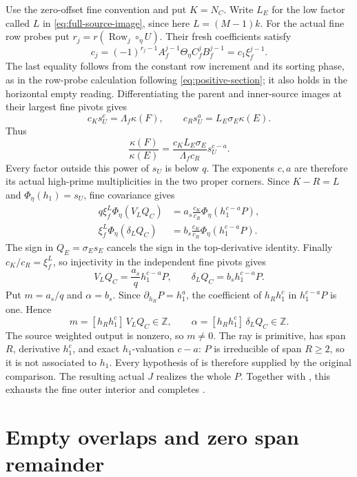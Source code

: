 \documentclass[11pt,a4paper]{amsart}
\numberwithin{equation}{section}
\theoremstyle{plain}
\theoremstyle{definition}
\newcommand{\Z}{\mathbb Z}
\newcommand{\Row}{\operatorname{Row}}
\begin{document}
Use the zero-offset fine convention and put \(K=N_C\).
Write \(L_E\) for the low factor called \(L\) in
\eqref{eq:full-source-image}, since here \(L=(M-1)k\).
For the actual fine row probes put \(r_j=r(\Row_j\circ_\eta U)\).
Their fresh coefficients satisfy
\[
 c_j=(-1)^{r_j-1}A_f^{j-1}\Theta_\eta C_f^jB_f^{j-1}
     =c_1\xi_f^{j-1}.
\]
The last equality follows from the constant row increment and its
sorting phase, as in the row-probe calculation following
\eqref{eq:positive-section}; it also holds in the horizontal empty
reading.  Differentiating the parent and inner-source images at their
largest fine pivots gives
\[
 c_Ks_U^c=\Lambda_f\kappa(F),\qquad
 c_Rs_U^a=L_E\sigma_E\kappa(E).
\]
Thus
\[
 \frac{\kappa(F)}{\kappa(E)}
 =\frac{c_KL_E\sigma_E}{\Lambda_fc_R}s_U^{c-a}.
\]
Every factor outside this power of \(s_U\) is below \(q\).
The exponents \(c,a\) are therefore its actual high-prime
multiplicities in the two proper corners.
Since \(K-R=L\) and \(\Phi_\eta(h_1)=s_U\), fine covariance gives
\[
 \begin{aligned}
 q\xi_f^L\Phi_\eta(V_LQ_C)
   &=a_s\frac{c_K}{c_R}\Phi_\eta(h_1^{c-a}P),\\
 \xi_f^L\Phi_\eta(\delta_LQ_C)
   &=b_s\frac{c_K}{c_R}\Phi_\eta(h_1^{c-a}P).
 \end{aligned}
\]
The sign in \(Q_E=\sigma_Es_E\) cancels the sign in the
top-derivative identity.  Finally \(c_K/c_R=\xi_f^L\), so injectivity
in the independent fine pivots gives
\[
 V_LQ_C=\frac{a_s}{q}h_1^{c-a}P,\qquad
 \delta_LQ_C=b_sh_1^{c-a}P.
\]
Put \(m=a_s/q\) and \(\alpha=b_s\).  Since
\(\partial_{h_R}P=h_1^a\), the coefficient of \(h_Rh_1^c\) in
\(h_1^{c-a}P\) is one.  Hence
\[
 m=[h_Rh_1^c]\,V_LQ_C\in\Z,\qquad
 \alpha=[h_Rh_1^c]\,\delta_LQ_C\in\Z.
\]
The source weighted output is nonzero, so \(m\ne0\).
The ray is primitive, has span \(R\), derivative \(h_1^c\), and
exact \(h_1\)-valuation \(c-a\): \(P\) is irreducible of span
\(R\ge2\), so it is not associated to \(h_1\).
Every hypothesis of  is therefore supplied by the
original comparison.  The resulting actual \(J\) realizes the whole \(P\).
Together with ,
this exhausts the fine outer interior and completes
.


\section{Empty overlaps and zero span remainder}\label{app:empty}
\end{document}
